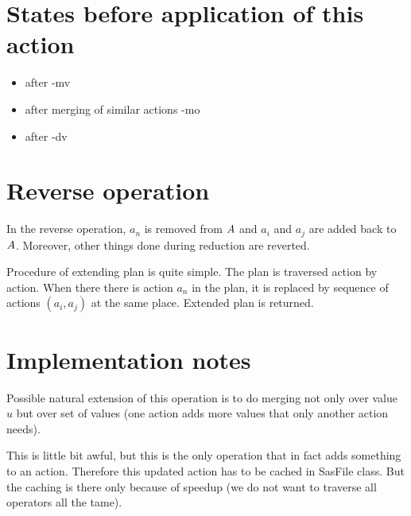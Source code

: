 	\section{States before application of this action}
	\begin{itemize}
		\item after -mv
		\item after merging of similar actions -mo
		\item after -dv
	\end{itemize}
	
	
	\section{Reverse operation}
	In the reverse operation, $a_n$ is removed from $A$ and $a_i$ and $a_j$ are added back to $A$. Moreover, other things done during reduction are reverted.
	
	Procedure of extending plan is quite simple. The plan is traversed action by action. When there there is action $a_n$ in the plan, it is replaced by sequence of actions $(a_i, a_j)$ at the same place. Extended plan is returned.
	
	
	\section{Implementation notes}

	Possible natural extension of this operation is to do merging not only over value $u$ but over set of values (one action adds more values that only another action needs).	
	
	This is little bit awful, but this is the only operation that in fact adds something to an action. Therefore this updated action has to be cached in SasFile class. But the caching is there only because of speedup (we do not want to traverse all operators all the tame).
	